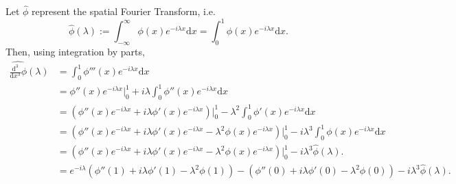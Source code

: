 Let $\hat{\phi}$ represent the spatial Fourier Transform, i.e.
$$\widehat{\phi}(\lambda) := \int_{-\infty}^{\infty} \phi(x) e^{-i\lambda x} \mathrm{d}x = \int_{0}^{1} \phi(x) e^{-i\lambda x} \mathrm{d}x.$$
Then, using integration by parts,
\begin{align*}
    \widehat{\frac{\mathrm{d}^3}{\mathrm{d}x^3}\phi}(\lambda) &= \int_{0}^{1} \phi'''(x) e^{-i\lambda x} \mathrm{d}x \\
    &= \phi''(x) e^{-i\lambda x}\bigg\rvert_0^1 + i\lambda\int_{0}^{1} \phi''(x) e^{-i\lambda x} \mathrm{d}x \\
    &= \left(\phi''(x) e^{-i\lambda x} + i\lambda \phi'(x) e^{-i\lambda x} \right)\bigg\rvert_0^1 - \lambda^2\int_{0}^{1} \phi'(x) e^{-i\lambda x} \mathrm{d}x \\
    &= \left(\phi''(x) e^{-i\lambda x} + i\lambda \phi'(x) e^{-i\lambda x} - \lambda^2 \phi(x) e^{-i\lambda x}\right) \bigg\rvert_0^1 - i\lambda^3\int_{0}^{1} \phi(x) e^{-i\lambda x} \mathrm{d}x \\
    &= \left(\phi''(x) e^{-i\lambda x} + i\lambda \phi'(x) e^{-i\lambda x} - \lambda^2 \phi(x) e^{-i\lambda x}\right) \bigg\rvert_0^1 - i\lambda^3\widehat\phi(\lambda). \\
	&= e^{-i\lambda}\left(\phi''(1) + i\lambda \phi'(1) - \lambda^2 \phi(1) \right) - \left(\phi''(0) + i\lambda \phi'(0) - \lambda^2 \phi(0) \right) - i\lambda^3\widehat\phi(\lambda). \\
\end{align*}